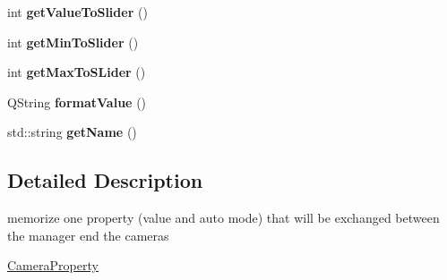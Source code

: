 \begin{DoxyCompactItemize}
\item 
\hypertarget{class_camera_manager_1_1_camera_property_aa07b5e54635ea946dde8e5e3407c38d8}{int {\bfseries get\-Value\-To\-Slider} ()}\label{class_camera_manager_1_1_camera_property_aa07b5e54635ea946dde8e5e3407c38d8}

\item 
\hypertarget{class_camera_manager_1_1_camera_property_a8680d2fcb0b57d832d7c13065320439f}{int {\bfseries get\-Min\-To\-Slider} ()}\label{class_camera_manager_1_1_camera_property_a8680d2fcb0b57d832d7c13065320439f}

\item 
\hypertarget{class_camera_manager_1_1_camera_property_a756d1e67c3e8f994e836c6b2b3334f13}{int {\bfseries get\-Max\-To\-S\-Lider} ()}\label{class_camera_manager_1_1_camera_property_a756d1e67c3e8f994e836c6b2b3334f13}

\item 
\hypertarget{class_camera_manager_1_1_camera_property_ab3f85bdadf9078d3af6c1cf42f8fb1f1}{Q\-String {\bfseries format\-Value} ()}\label{class_camera_manager_1_1_camera_property_ab3f85bdadf9078d3af6c1cf42f8fb1f1}

\item 
\hypertarget{class_camera_manager_1_1_camera_property_a6cf265bfe49e74d23d946e4d8a6b8f98}{std\-::string {\bfseries get\-Name} ()}\label{class_camera_manager_1_1_camera_property_a6cf265bfe49e74d23d946e4d8a6b8f98}

\end{DoxyCompactItemize}


\subsection{Detailed Description}
memorize one property (value and auto mode) that will be exchanged between the manager end the cameras 

\hyperlink{class_camera_manager_1_1_camera_property}{Camera\-Property} 

